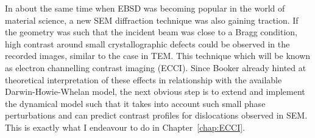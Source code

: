 In about the same time when EBSD was becoming popular in the world of material science, a new SEM diffraction technique was also gaining traction. If the geometry was such that the incident beam was close to a Bragg condition, high contrast around small crystallographic defects could be observed in the recorded images, similar to the case in TEM. This technique which will be known as electron channelling contrast imaging (ECCI). Since Booker already hinted at theoretical interpretation of these effects in relationship with the available Darwin-Howie-Whelan model, the next obvious step is  to extend and implement the dynamical model such that it takes into account such small phase perturbations and can predict contrast profiles for dislocations observed in SEM. This is exactly what I endeavour to do in  Chapter~\ref{chap:ECCI}. 
